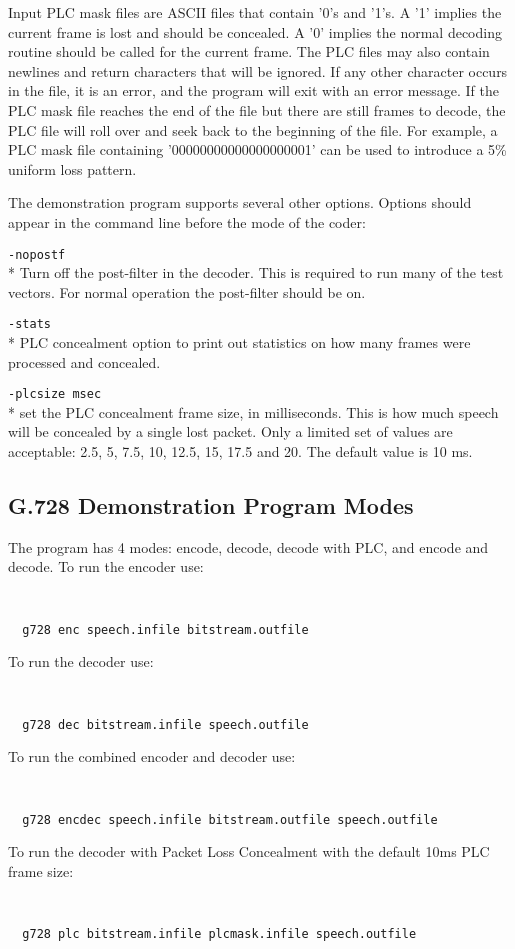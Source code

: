 Input PLC mask files are ASCII files that contain '0's and '1's.
A '1' implies the current frame is lost and should be concealed.
A '0' implies the normal decoding routine should be called for the current
frame. The PLC files may also contain newlines and return
characters that will be ignored. If any other character occurs in the file,
it is an error, and the program will exit with an error message.
If the PLC mask file reaches the end of the file
but there are still frames to decode, the PLC file will roll over and
seek back to the beginning of the file. For example, a PLC mask file containing
'00000000000000000001' can be used to introduce a 5\% uniform loss pattern.

The demonstration program supports several other options. Options
should appear in the command line before the mode of the coder:

{\tt -nopostf}\\*
Turn off the post-filter in the decoder. This is required to run many of
the test vectors. For normal operation the post-filter should be on.

{\tt -stats}\\*
PLC concealment option to print out statistics on how
many frames were processed and concealed.

{\tt -plcsize msec}\\*
set the PLC concealment frame size, in milliseconds. This is how much speech
will be concealed by a single lost packet. Only a limited set of values
are acceptable: 2.5, 5, 7.5, 10, 12.5, 15, 17.5 and 20. The default value
is 10 ms.

\subsection {G.728 Demonstration Program Modes}

The program has 4 modes: encode, decode, decode with PLC, and encode and decode.
To run the encoder use:
{\tt\small
\begin{verbatim}
  g728 enc speech.infile bitstream.outfile
\end{verbatim}
}

To run the decoder use:
{\tt\small
\begin{verbatim}
  g728 dec bitstream.infile speech.outfile
\end{verbatim}
}

To run the combined encoder and decoder use:
{\tt\small
\begin{verbatim}
  g728 encdec speech.infile bitstream.outfile speech.outfile
\end{verbatim}
}
To run the decoder with Packet Loss Concealment with the default 10ms
PLC frame size:
{\tt\small
\begin{verbatim}
  g728 plc bitstream.infile plcmask.infile speech.outfile
\end{verbatim}
}

